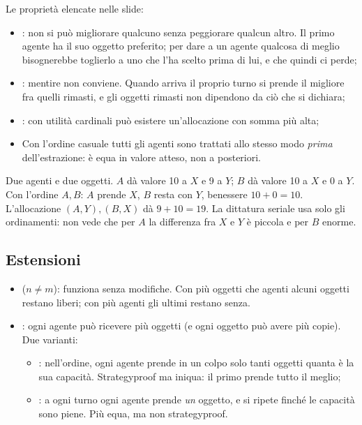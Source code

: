 Le proprietà elencate nelle slide:
\begin{itemize}
  \item {}: non si può migliorare qualcuno senza peggiorare qualcun
        altro. Il primo agente ha il suo oggetto preferito; per dare a un agente qualcosa di
        meglio bisognerebbe toglierlo a uno che l'ha scelto prima di lui, e che quindi
        ci perde;
  \item {}: mentire non conviene. Quando arriva il proprio turno si prende
        il migliore fra quelli rimasti, e gli oggetti rimasti non dipendono da ciò che
        si dichiara;
  \item {}: con utilità cardinali può esistere
        un'allocazione con somma più alta;
  \item {} Con l'ordine casuale tutti gli agenti sono trattati allo stesso modo
        \emph{prima} dell'estrazione: è equa in valore atteso, non a posteriori.
\end{itemize}

\begin{esempio}
Due agenti e due oggetti. $A$ dà valore 10 a $X$ e 9 a $Y$; $B$ dà valore 10 a $X$ e 0 a
$Y$. Con l'ordine $A, B$: $A$ prende $X$, $B$ resta con $Y$, benessere $10 + 0 = 10$.
L'allocazione $(A, Y), (B, X)$ dà $9 + 10 = 19$. La dittatura seriale usa solo gli
ordinamenti: non vede che per $A$ la differenza fra $X$ e $Y$ è piccola e per $B$ enorme.
\end{esempio}

\subsection{Estensioni}

\begin{itemize}
  \item {} ($n \ne m$): funziona senza modifiche. Con
        più oggetti che agenti alcuni oggetti restano liberi; con più agenti gli ultimi
        restano senza.
  \item {}: ogni agente può ricevere più oggetti (e ogni oggetto può avere più
        copie). Due varianti:
        \begin{itemize}
          \item {}: nell'ordine, ogni agente prende
                in un colpo solo tanti oggetti quanta è la sua capacità. Strategyproof ma
                iniqua: il primo prende tutto il meglio;
          \item {}: a ogni turno ogni agente prende \emph{un} oggetto, e si
                ripete finché le capacità sono piene. Più equa, ma non strategyproof.
        \end{itemize}
\end{itemize}

